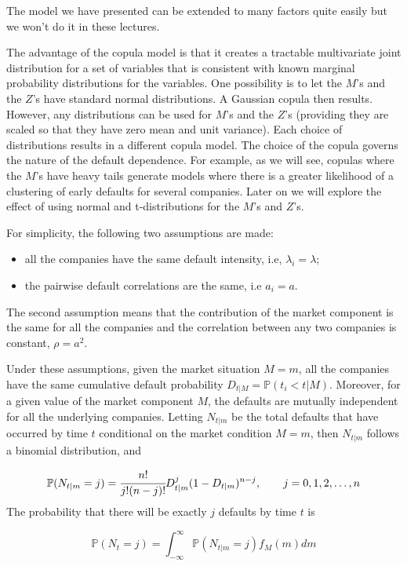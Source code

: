 \documentclass[11pt]{article}
\providecommand{\tightlist}{%
      \setlength{\itemsep}{0pt}\setlength{\parskip}{0pt}}
\begin{document}
The model we have presented can be extended to many factors quite easily
but we won't do it in these lectures.

The advantage of the copula model is that it creates a tractable
multivariate joint distribution for a set of variables that is
consistent with known marginal probability distributions for the
variables. One possibility is to let the \(M\)'s and the \(Z\)'s have
standard normal distributions. A Gaussian copula then results. However,
any distributions can be used for \(M\)'s and the \(Z\)'s (providing
they are scaled so that they have zero mean and unit variance). Each
choice of distributions results in a different copula model. The choice
of the copula governs the nature of the default dependence. For example,
as we will see, copulas where the \(M\)'s have heavy tails generate
models where there is a greater likelihood of a clustering of early
defaults for several companies. Later on we will explore the effect of
using normal and t-distributions for the \(M\)'s and \(Z\)'s.

For simplicity, the following two assumptions are made:

\begin{itemize}
\tightlist
\item
  all the companies have the same default intensity, i.e,
  \(\lambda_i = \lambda\);
\item
  the pairwise default correlations are the same, i.e \(a_i = a\).
\end{itemize}

The second assumption means that the contribution of the market
component is the same for all the companies and the correlation between
any two companies is constant, \(\rho = a^2\).

Under these assumptions, given the market situation \(M = m\), all the
companies have the same cumulative default probability
\(D_{t|M}=\mathbb{P}(t_i < t|M)\). Moreover, for a given value of the
market component \(M\), the defaults are mutually independent for all
the underlying companies. Letting \(N_{t|m}\) be the total defaults that
have occurred by time \(t\) conditional on the market condition
\(M = m\), then \(N_{t|m}\) follows a binomial distribution, and

\[\mathbb{P}(N_{t|m} = j) = \cfrac{n!}{j!(n-j)!}D^j_{t|m}(1-D_{t|m})^{n-j},\qquad  j=0, 1, 2,\ldots,n\]
The probability that there will be exactly \(j\) defaults by time \(t\)
is

\[\mathbb{P}(N_{t} = j) = \int_{-\infty}^{\infty}{\mathbb{P}(N_{t|m} = j)f_M(m)dm}\]
\end{document}
